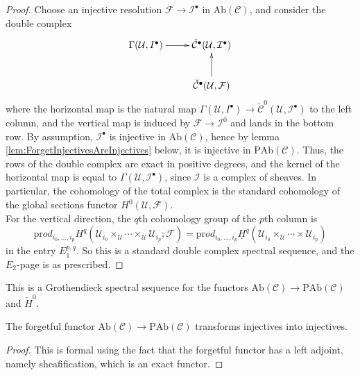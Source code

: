   \begin{proof}
    Choose an injective resolution $\mathcal{F}\to \mathcal{I}^\bullet$ in $\text{Ab}(\mathcal{C})$, and consider the double complex
$$
\xymatrix{
{\Gamma(\mathcal{U},  I^\bullet)}  \ar[r] & {\check{\mathcal{C}}^\bullet(\mathcal{U}, \mathcal{I}^\bullet)} \\ 
& {\check{\mathcal{C}}^\bullet(\mathcal{U}, \mathcal{F})} \ar[u]
}
$$
where the horizontal map is the natural map $\Gamma(\mathcal{U},  I^\bullet) \to \check{\mathcal{C}}^0(\mathcal{U}, \mathcal{I}^\bullet)$ to the left column, and the vertical map is induced by  $\mathcal{F}\to \mathcal{I}^0$ and lands in the bottom row. By assumption, $\mathcal{I}^\bullet$ is injective in $\text{Ab}(\mathcal{C})$, hence by lemma \ref{lem:ForgetInjectivesAreInjectives} below, it is injective in $\text{PAb}(\mathcal{C})$. Thus, the rows of the double complex are exact in positive degrees, and the kernel of the horizontal map is equal to $\Gamma(\mathcal{U}, \mathcal{I}^\bullet)$, since $\mathcal{I}$ is a complex of sheaves. In particular, the cohomology of the total complex is the standard cohomology of the global sections functor $H^0(\mathcal{U}, \mathcal{F})$. 
\\
For the vertical direction, the $q$th cohomology group of the $p$th column is 
$$ 
\text{pr}od_{i_0,\ldots, i_p}  H^q(\mathcal{U}_{i_0}\times_\mathcal{U} \cdots \times_\mathcal{U} \mathcal{U}_{i_p} ; \mathcal{F}) =\text{pr}od_{i_0, \dots, i_p}\underline{H}^q(\mathcal{U}_{i_0}\times_\mathcal{U} \cdots \times \mathcal{U}_{i_p})
$$
  in the entry $E_1^{p,q}$. So this is a standard double complex spectral sequence, and the $E_2$-page is as prescribed.
  \end{proof}
  
  \begin{remark}
  This is a Grothendieck spectral sequence for the functors $\text{Ab}(\mathcal{C}) \to \text{PAb}(\mathcal{C})$ and $\check H^0$.
  \end{remark}
  
  \begin{lemma} \label{lem:ForgetInjectivesAreInjectives}
The forgetful functor $\text{Ab}(\mathcal{C})\to \text{PAb}(\mathcal{C})$ transforms injectives into injectives.  
  \end{lemma}
  
\begin{proof}
This is formal using the fact that the forgetful functor has a left adjoint, namely sheafification, which is an exact functor. 
\end{proof}

